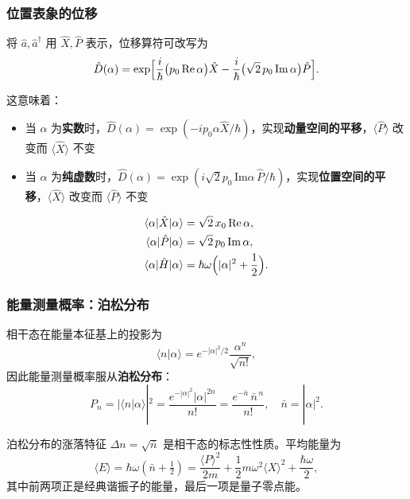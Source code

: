 \subsubsection{位置表象的位移}

将 $\hat{a},\hat{a}^\dagger$ 用 $\hat{X},\hat{P}$ 表示，位移算符可改写为
\[
\hat{D}(\alpha) = \exp\Bigl[\frac{i}{\hbar}\bigl(p_0\,\text{Re}\,\alpha\bigr)\hat{X}
- \frac{i}{\hbar}\bigl(\sqrt{2}\,p_0\,\text{Im}\,\alpha\bigr)\hat{P}\Bigr].
\]

这意味着：
\begin{itemize}[nosep]
    \item 当 $\alpha$ 为\textbf{实数}时，$\hat{D}(\alpha) = \exp(-i p_0 \alpha \hat{X}/\hbar)$，实现\textbf{动量空间的平移}，$\langle\hat{P}\rangle$ 改变而 $\langle\hat{X}\rangle$ 不变
    \item 当 $\alpha$ 为\textbf{纯虚数}时，$\hat{D}(\alpha) = \exp(i \sqrt{2}p_0 \,\text{Im}\alpha \,\hat{P}/\hbar)$，实现\textbf{位置空间的平移}，$\langle\hat{X}\rangle$ 改变而 $\langle\hat{P}\rangle$ 不变
\end{itemize}

\begin{formulabox}[相干态的期望值]
\begin{align*}
\langle\alpha|\hat{X}|\alpha\rangle &= \sqrt{2}\,x_0\,\text{Re}\,\alpha, \\
\langle\alpha|\hat{P}|\alpha\rangle &= \sqrt{2}\,p_0\,\text{Im}\,\alpha, \\
\langle\alpha|\hat{H}|\alpha\rangle &= \hbar\omega\Bigl(|\alpha|^2 + \frac12\Bigr).
\end{align*}
\end{formulabox}

\subsubsection{能量测量概率：泊松分布}

相干态在能量本征基上的投影为
\[
\langle n|\alpha\rangle = e^{-|\alpha|^2/2}\frac{\alpha^n}{\sqrt{n!}},
\]
因此能量测量概率服从\textbf{泊松分布}：
\begin{equation}
\boxed{P_n = |\langle n|\alpha\rangle|^2 = \frac{e^{-|\alpha|^2}|\alpha|^{2n}}{n!}
= \frac{e^{-\bar{n}}\,\bar{n}^{\,n}}{n!},\quad \bar{n}=|\alpha|^2.}
\end{equation}

泊松分布的涨落特征 $\Delta n = \sqrt{\bar{n}}$ 是相干态的标志性性质。平均能量为
\[
\langle E\rangle = \hbar\omega(\bar{n} + \tfrac12)
= \frac{\langle P\rangle^2}{2m} + \frac12 m\omega^2 \langle X\rangle^2 + \frac{\hbar\omega}{2},
\]
其中前两项正是经典谐振子的能量，最后一项是量子零点能。

